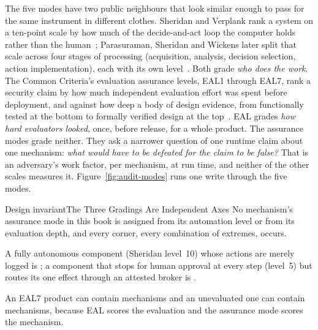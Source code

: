 \documentclass[11pt,a4paper]{article}
\theoremstyle{definition}
\theoremstyle{remark}
\begin{document}
\pdmarginpagebreak
The five modes have two public neighbours that look similar enough to pass for
the same instrument in different clothes.
Sheridan and Verplank rank a system on a ten-point scale by how much of the
decide-and-act loop the computer holds rather than the
human~; Parasuraman, Sheridan and Wickens later
split that scale across four stages of processing (acquisition, analysis,
decision selection, action implementation), each with its own
level~. Both grade \emph{who does the work}. The Common
Criteria's evaluation assurance levels, EAL1 through EAL7, rank a security
claim by how much independent evaluation effort was spent before deployment,
and against how deep a body of design evidence, from functionally tested at the
bottom to formally verified design at the top~. EAL grades
\emph{how hard evaluators looked}, once, before release, for a whole product.
The assurance modes grade neither. They ask a narrower question of one runtime
claim about one mechanism: \emph{what would have to be defeated for the claim
to be false?} That is an adversary's work factor, per mechanism, at run time,
and neither of the other scales measures it.
Figure~\ref{fig:audit-modes} runs one write through the five modes.



\begin{pdclaim}{Design invariant}{The Three Gradings Are Independent Axes}
\setlength{\parskip}{4pt plus 1pt}
No mechanism's assurance mode in this book is assigned from its automation level
or from its evaluation depth, and every corner, every combination of extremes,
occurs.

A fully autonomous
component (Sheridan level~10) whose actions are merely logged is
; a component that stops for human approval at every step
(level~5) but routes its one effect through an attested broker is
.

An EAL7 product can contain 
mechanisms and an unevaluated one can contain  mechanisms,
because EAL scores the evaluation and the assurance mode scores the mechanism.
\end{pdclaim}
\end{document}
